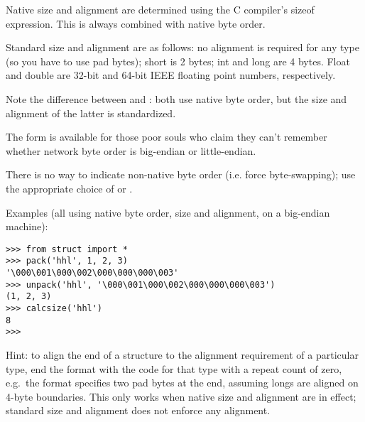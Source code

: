 Native size and alignment are determined using the C compiler's sizeof
expression.  This is always combined with native byte order.

Standard size and alignment are as follows: no alignment is required
for any type (so you have to use pad bytes); short is 2 bytes; int and
long are 4 bytes.  Float and double are 32-bit and 64-bit IEEE floating
point numbers, respectively.

Note the difference between  and \character{=}: both use native
byte order, but the size and alignment of the latter is standardized.

The form \character{!} is available for those poor souls who claim they
can't remember whether network byte order is big-endian or
little-endian.

There is no way to indicate non-native byte order (i.e. force
byte-swapping); use the appropriate choice of \character{<} or
\character{>}.

Examples (all using native byte order, size and alignment, on a
big-endian machine):

\begin{verbatim}
>>> from struct import *
>>> pack('hhl', 1, 2, 3)
'\000\001\000\002\000\000\000\003'
>>> unpack('hhl', '\000\001\000\002\000\000\000\003')
(1, 2, 3)
>>> calcsize('hhl')
8
>>> 
\end{verbatim}
%
Hint: to align the end of a structure to the alignment requirement of
a particular type, end the format with the code for that type with a
repeat count of zero, e.g.\ the format  specifies two
pad bytes at the end, assuming longs are aligned on 4-byte boundaries.
This only works when native size and alignment are in effect;
standard size and alignment does not enforce any alignment.

\begin{seealso}
\end{seealso}

